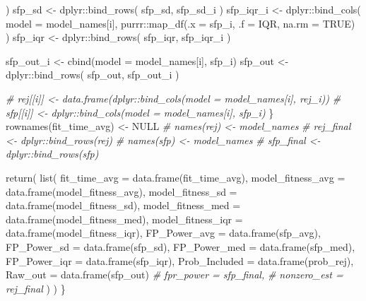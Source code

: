 \documentclass[
]{article}
\newenvironment{Shaded}{\begin{snugshade}}{\end{snugshade}}
\newcommand{\AttributeTok}[1]{\textcolor[rgb]{0.77,0.63,0.00}{#1}}
\newcommand{\CommentTok}[1]{\textcolor[rgb]{0.56,0.35,0.01}{\textit{#1}}}
\newcommand{\ConstantTok}[1]{\textcolor[rgb]{0.00,0.00,0.00}{#1}}
\newcommand{\FunctionTok}[1]{\textcolor[rgb]{0.00,0.00,0.00}{#1}}
\newcommand{\NormalTok}[1]{#1}
\newcommand{\OtherTok}[1]{\textcolor[rgb]{0.56,0.35,0.01}{#1}}
\newcommand{\SpecialCharTok}[1]{\textcolor[rgb]{0.00,0.00,0.00}{#1}}
\begin{document}
\begin{Shaded}
\begin{Highlighting}[]
\NormalTok{    )}
\NormalTok{    sfp\_sd }\OtherTok{\textless{}{-}}\NormalTok{ dplyr}\SpecialCharTok{::}\FunctionTok{bind\_rows}\NormalTok{(}
\NormalTok{      sfp\_sd,}
\NormalTok{      sfp\_sd\_i}
\NormalTok{    )}
\NormalTok{    sfp\_iqr\_i }\OtherTok{\textless{}{-}}\NormalTok{ dplyr}\SpecialCharTok{::}\FunctionTok{bind\_cols}\NormalTok{(}
      \AttributeTok{model =}\NormalTok{ model\_names[i],}
\NormalTok{      purrr}\SpecialCharTok{::}\FunctionTok{map\_df}\NormalTok{(}\AttributeTok{.x =}\NormalTok{ sfp\_i, }\AttributeTok{.f =}\NormalTok{ IQR, }\AttributeTok{na.rm =} \ConstantTok{TRUE}\NormalTok{)}
\NormalTok{    )}
\NormalTok{    sfp\_iqr }\OtherTok{\textless{}{-}}\NormalTok{ dplyr}\SpecialCharTok{::}\FunctionTok{bind\_rows}\NormalTok{(}
\NormalTok{      sfp\_iqr,}
\NormalTok{      sfp\_iqr\_i}
\NormalTok{    )}
    
\NormalTok{    sfp\_out\_i }\OtherTok{\textless{}{-}} \FunctionTok{cbind}\NormalTok{(}\AttributeTok{model =}\NormalTok{ model\_names[i], sfp\_i)}
\NormalTok{    sfp\_out }\OtherTok{\textless{}{-}}\NormalTok{ dplyr}\SpecialCharTok{::}\FunctionTok{bind\_rows}\NormalTok{(}
\NormalTok{      sfp\_out,}
\NormalTok{      sfp\_out\_i}
\NormalTok{    )}
    
    \CommentTok{\# rej[[i]] \textless{}{-} data.frame(dplyr::bind\_cols(model = model\_names[i], rej\_i))}
    \CommentTok{\# sfp[[i]] \textless{}{-} dplyr::bind\_cols(model = model\_names[i], sfp\_i)}
\NormalTok{  \}}
  \FunctionTok{rownames}\NormalTok{(fit\_time\_avg) }\OtherTok{\textless{}{-}} \ConstantTok{NULL}
  \CommentTok{\# names(rej) \textless{}{-} model\_names}
  \CommentTok{\# rej\_final \textless{}{-} dplyr::bind\_rows(rej)}
  \CommentTok{\# names(sfp) \textless{}{-} model\_names}
  \CommentTok{\# sfp\_final \textless{}{-} dplyr::bind\_rows(sfp)}
  
  \FunctionTok{return}\NormalTok{(}
    \FunctionTok{list}\NormalTok{(}
      \AttributeTok{fit\_time\_avg =} \FunctionTok{data.frame}\NormalTok{(fit\_time\_avg),}
      \AttributeTok{model\_fitness\_avg =} \FunctionTok{data.frame}\NormalTok{(model\_fitness\_avg),}
      \AttributeTok{model\_fitness\_sd =} \FunctionTok{data.frame}\NormalTok{(model\_fitness\_sd),}
      \AttributeTok{model\_fitness\_med =} \FunctionTok{data.frame}\NormalTok{(model\_fitness\_med),}
      \AttributeTok{model\_fitness\_iqr =} \FunctionTok{data.frame}\NormalTok{(model\_fitness\_iqr),}
      \AttributeTok{FP\_Power\_avg =} \FunctionTok{data.frame}\NormalTok{(sfp\_avg),}
      \AttributeTok{FP\_Power\_sd =} \FunctionTok{data.frame}\NormalTok{(sfp\_sd),}
      \AttributeTok{FP\_Power\_med =} \FunctionTok{data.frame}\NormalTok{(sfp\_med),}
      \AttributeTok{FP\_Power\_iqr =} \FunctionTok{data.frame}\NormalTok{(sfp\_iqr),}
      \AttributeTok{Prob\_Included =} \FunctionTok{data.frame}\NormalTok{(prob\_rej),}
      \AttributeTok{Raw\_out =} \FunctionTok{data.frame}\NormalTok{(sfp\_out)}
      \CommentTok{\# fpr\_power = sfp\_final, }
      \CommentTok{\# nonzero\_est = rej\_final}
\NormalTok{      )}
\NormalTok{  )}
\NormalTok{\}}
\end{Highlighting}
\end{Shaded}
\end{document}
